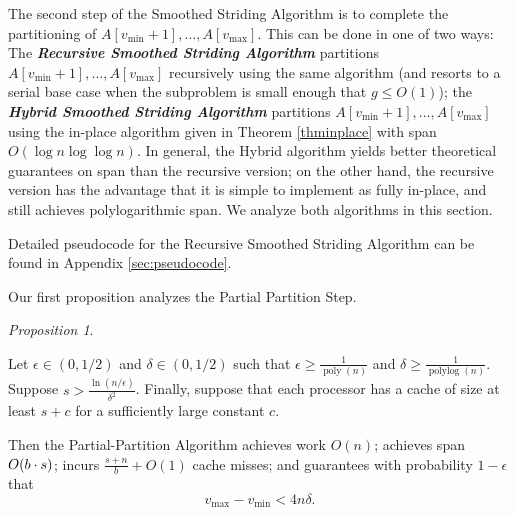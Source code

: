 \documentclass[sigplan, 10pt, nonacm]{acmart}
\DeclarePairedDelimiter{\paren}{(}{)}
\newcommand{\poly}{\operatorname{poly}}
\newcommand{\polylog}{\operatorname{polylog}}
\newcommand{\defn}[1]{{\textit{\textbf{\boldmath #1}}}}
\renewcommand{\paragraph}[1]{\vspace{0.09in}\noindent{\bf \boldmath #1.}}
\theoremstyle{remark}
\newtheorem{proposition}[thm]{Proposition}
\theoremstyle{remark}
\begin{document}
The second step of the Smoothed Striding Algorithm is to complete the
partitioning of $A[v_{\text{min}} + 1], \ldots, A[v_{\text{max}}]$. This can be done
in one of two ways: The \defn{Recursive Smoothed Striding Algorithm}
partitions $A[v_{\text{min}} + 1], \ldots, A[v_{\text{max}}]$ recursively using the
same algorithm (and resorts to a serial base case when the subproblem
is small enough that $g \le O(1)$); the \defn{Hybrid Smoothed Striding
  Algorithm} partitions $A[v_{\text{min}} + 1], \ldots, A[v_{\text{max}}]$ using the
in-place algorithm given in Theorem \ref{thminplace} with span $O(\log
n \log \log n)$. In general, the Hybrid algorithm yields better
theoretical guarantees on span than the recursive version; on the
other hand, the recursive version has the advantage that it is
simple to implement as fully in-place, and still achieves
polylogarithmic span. We analyze both algorithms in this section.

Detailed pseudocode for the Recursive Smoothed Striding Algorithm can
be found in Appendix \ref{sec:pseudocode}.

\paragraph{Algorithm Analysis} Our first proposition analyzes the Partial Partition Step.
\begin{proposition}
  \label{prop:generalResult}
  
  Let $\epsilon \in (0, 1/2)$ and $\delta \in (0, 1/2)$ such that
  $\epsilon \ge \frac{1}{\poly(n)}$ and $\delta \ge
  \frac{1}{\polylog(n)}$. Suppose $s > \frac{\ln
    (n/\epsilon)}{\delta^2}$. Finally, suppose that each processor has
  a cache of size at least $s + c$ for a sufficiently large constant
  $c$.

  Then the Partial-Partition Algorithm achieves work $O(n)$; achieves
  span $O\paren*{b \cdot s}$; incurs $\frac{s+n}{b} + O(1)$ cache
  misses; and guarantees with probability $1 - \epsilon$ that
  $$v_{\text{max}}-v_{\text{min}} < 4 n \delta.$$
\end{proposition}
\end{document}
